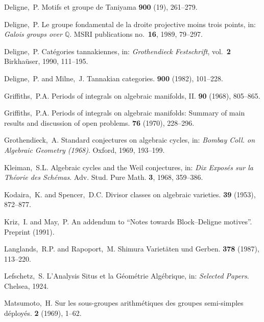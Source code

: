 \documentclass{article}
\theoremstyle{plain}
\theoremstyle{definition}
\begin{document}
\begin{thebibliography}{34}
  {\sc Deligne,~P.}
  \newblock Motifs et groupe de Taniyama
   \textbf{900} (19), 261--279.

  {\sc Deligne,~P.}
  \newblock Le groupe fondamental de la droite projective moins trois points, in: {\em Galois groups over $\mathbb{Q}$}.
  \newblock MSRI publications no.~\textbf{16}, 1989, 79--297.

  {\sc Deligne,~P.}
  \newblock Cat\'{e}gories tannakiennes, in: {\em Grothendieck Festschrift}, vol.~\textbf{2}
  \newblock Birkha\"{u}ser, 1990, 111--195.

  {\sc Deligne,~P. and Milne,~J.}
  \newblock Tannakian categories.
   \textbf{900} (1982), 101--228.

  {\sc Griffiths,~P.A.}
  \newblock Periods of integrals on algebraic manifolds, II.
   \textbf{90} (1968), 805--865.

  {\sc Griffiths,~P.A.}
  \newblock Periods of integrals on algebraic manifolds: Summary of main results and discussion of open problems.
   \textbf{76} (1970), 228--296.

  {\sc Grothendieck,~A.}
  \newblock Standard conjectures on algebraic cycles, in: {\em Bombay Coll. on Algebraic Geometry (1968)}.
  \newblock Oxford, 1969, 193--199.

  {\sc Kleiman,~S.L.}
  \newblock Algebraic cycles and the Weil conjectures, in: {\em Dix Expos\'{e}s sur la Th\'{e}orie des Sch\'{e}mas}.
  \newblock Adv. Stud. Pure Math. \textbf{3}, 1968, 359--386.

  {\sc Kodaira,~K. and Spencer,~D.C.}
  \newblock Divisor classes on algebraic varieties.
   \textbf{39} (1953), 872--877.

  {\sc Kriz,~I. and May,~P.}
  \newblock An addendum to ``Notes towards Block--Deligne motives''.
  \newblock Preprint (1991).

  {\sc Langlands,~R.P. and Rapoport,~M.}
  \newblock Shimura Variet\"{a}ten und Gerben.
   \textbf{378} (1987), 113--220.

  {\sc Lefschetz,~S.}
  \newblock L'Analysis Situs et la G\'{e}om\'{e}trie Alg\'{e}brique, in: {\em Selected Papers}.
  \newblock Chelsea, 1924.

  {\sc Matsumoto,~H.}
  \newblock Sur les sous-groupes arithm\'{e}tiques des groupes semi-simples d\'{e}ploy\'{e}s.
   \textbf{2} (1969), 1--62.


\end{thebibliography}
\end{document}
